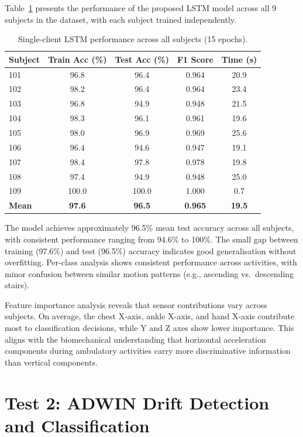 Table~\ref{tab:multi_accuracy} presents the performance of the proposed LSTM model across all 9 subjects in the dataset, with each subject trained independently.

\begin{table}[ht]
\centering
\caption{Single-client LSTM performance across all subjects (15 epochs).}
\label{tab:multi_accuracy}
\begin{tabular}{lcccc}
\toprule
\textbf{Subject} & \textbf{Train Acc (\%)} & \textbf{Test Acc (\%)} & \textbf{F1 Score} & \textbf{Time (s)} \\
\midrule
101 & 96.8 & 96.4 & 0.964 & 20.9 \\
102 & 98.2 & 96.4 & 0.964 & 23.4 \\
103 & 96.8 & 94.9 & 0.948 & 21.5 \\
104 & 98.3 & 96.1 & 0.961 & 19.6 \\
105 & 98.0 & 96.9 & 0.969 & 25.6 \\
106 & 96.4 & 94.6 & 0.947 & 19.1 \\
107 & 98.4 & 97.8 & 0.978 & 19.8 \\
108 & 97.4 & 94.9 & 0.948 & 25.0 \\
109 & 100.0 & 100.0 & 1.000 & 0.7 \\
\midrule
\textbf{Mean} & \textbf{97.6} & \textbf{96.5} & \textbf{0.965} & \textbf{19.5} \\
\bottomrule
\end{tabular}
\end{table}

The model achieves approximately 96.5\% mean test accuracy across all subjects, with consistent performance ranging from 94.6\% to 100\%. The small gap between training (97.6\%) and test (96.5\%) accuracy indicates good generalisation without overfitting. Per-class analysis shows consistent performance across activities, with minor confusion between similar motion patterns (e.g., ascending vs.~descending stairs).

Feature importance analysis reveals that sensor contributions vary across subjects. On average, the chest X-axis, ankle X-axis, and hand X-axis contribute most to classification decisions, while Y and Z axes show lower importance. This aligns with the biomechanical understanding that horizontal acceleration components during ambulatory activities carry more discriminative information than vertical components.

\section{Test 2: ADWIN Drift Detection and Classification}

